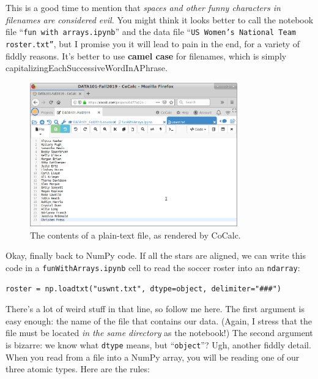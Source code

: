 
This is a good time to mention that \textit{spaces and other funny characters
in filenames are considered evil.} You might think it looks better to call the
notebook file ``\texttt{fun with arrays.ipynb}'' and the data file ``\texttt{US
Women's National Team roster.txt''}, but I promise you it will lead to pain in
the end, for a variety of fiddly reasons. It's better to use \textbf{camel
case} for filenames, which is simply
capitalizingEachSuccessive\-Word\-InAPhrase.

\begin{figure}[ht]
\centering
\includegraphics[width=0.8\textwidth]{textFile.png}
\medskip
\caption{The contents of a plain-text file, as rendered by CoCalc.}
\label{fig:textFile}
\end{figure}

Okay, finally back to NumPy code. If all the stars are aligned, we can write
this code in a \texttt{funWithArrays.ipynb} cell to read the soccer roster into
an \texttt{ndarray}:

\begin{Verbatim}[fontsize=\footnotesize,samepage=true,frame=single,framesep=3mm]
roster = np.loadtxt("uswnt.txt", dtype=object, delimiter="###")
\end{Verbatim}

There's a lot of weird stuff in that line, so follow me here. The first
argument is easy enough: the name of the file that contains our data. (Again, I
stress that the file must be located \textit{in the same directory} as the
notebook!) The second argument is bizarre: we know what \texttt{dtype} means,
but ``\texttt{object}''? Ugh, another fiddly detail. When you read from a file
into a NumPy array, you will be reading one of our three atomic types. Here are
the rules:

